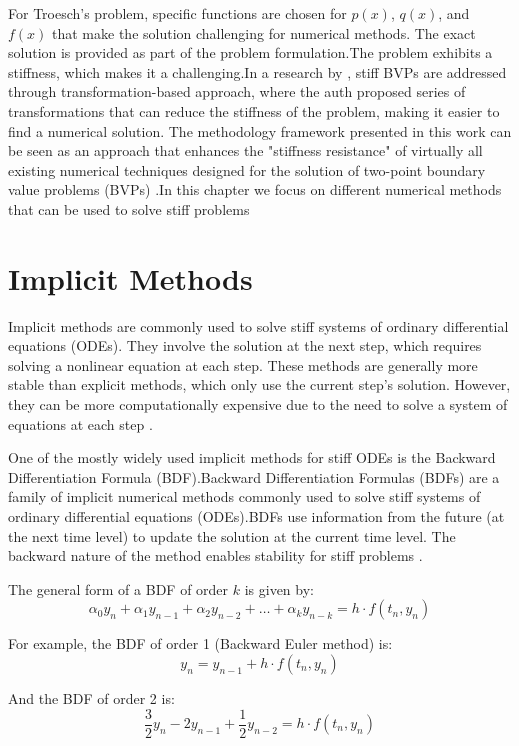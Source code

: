 For Troesch's problem, specific functions are chosen for $p(x)$, $q(x)$, and $f(x)$ that make the solution challenging for numerical methods. The exact solution is provided as part of the problem formulation.The problem exhibits a stiffness, which makes it a challenging.In a research by \cite{dragunov2021transformation}, stiff BVPs are addressed through transformation-based approach, where the auth \cite{dragunov2021transformation} proposed series of transformations that can reduce the stiffness of the problem, making it easier to find a numerical solution. The methodology framework presented in this work can be seen as an approach that enhances the "stiffness resistance" of virtually all existing numerical techniques designed for the solution of two-point boundary value problems (BVPs) \cite{dragunov2021transformation}.In this chapter we focus on different numerical methods that can be used to solve stiff problems

\section{Implicit Methods}
Implicit methods are commonly used to solve stiff systems of ordinary differential equations (ODEs). They involve the solution at the next step, which requires solving a nonlinear equation at each step. These methods are generally more stable than explicit methods, which only use the current step's solution. However, they can be more computationally expensive due to the need to solve a system of equations at each step \cite{thohura2013numerical}.

One of the mostly widely used implicit methods for stiff ODEs is the Backward Differentiation Formula (BDF).Backward Differentiation Formulas (BDFs) are a family of implicit numerical methods commonly used to solve stiff systems of ordinary differential equations (ODEs).BDFs use information from the future (at the next time level) to update the solution at the current time level. The backward nature of the method enables stability for stiff problems \cite{numericalrecipes}.

The general form of a BDF of order \(k\) is given by:
\[
\alpha_0 y_n + \alpha_1 y_{n-1} + \alpha_2 y_{n-2} + \ldots + \alpha_k y_{n-k} = h \cdot f(t_n, y_n)
\]

For example, the BDF of order 1 (Backward Euler method) is:
\[
y_n = y_{n-1} + h \cdot f(t_n, y_n)
\]

And the BDF of order 2 is:
\[
\frac{3}{2} y_n - 2y_{n-1} + \frac{1}{2} y_{n-2} = h \cdot f(t_n, y_n)
\]

